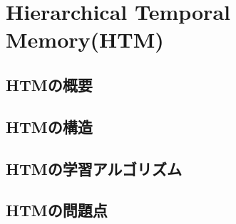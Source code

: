 \chapter{Hierarchical Temporal Memory(HTM)}

\section{HTMの概要}

\section{HTMの構造}

\section{HTMの学習アルゴリズム}

\section{HTMの問題点}
